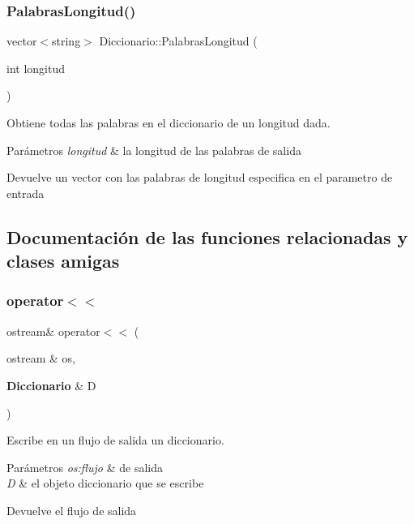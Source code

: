 \subsubsection{Palabras\+Longitud()}
{\footnotesize\ttfamily vector$<$string$>$ Diccionario\+::\+Palabras\+Longitud (\begin{DoxyParamCaption}\item[{int}]{longitud }\end{DoxyParamCaption})\hspace{0.3cm}{\ttfamily [inline]}}



Obtiene todas las palabras en el diccionario de un longitud dada. 


\begin{DoxyParams}{Parámetros}
{\em longitud} & la longitud de las palabras de salida \\
\hline
\end{DoxyParams}
\begin{DoxyReturn}{Devuelve}
un vector con las palabras de longitud especifica en el parametro de entrada 
\end{DoxyReturn}


\subsection{Documentación de las funciones relacionadas y clases amigas}
\mbox{\label{classDiccionario_ab113838fe9eefef3cc1c6710e45bde31}} 
\subsubsection{operator$<$$<$}
{\footnotesize\ttfamily ostream\& operator$<$$<$ (\begin{DoxyParamCaption}\item[{ostream \&}]{os,  }\item[{\textbf{ Diccionario} \&}]{D }\end{DoxyParamCaption})\hspace{0.3cm}{\ttfamily [friend]}}



Escribe en un flujo de salida un diccionario. 


\begin{DoxyParams}{Parámetros}
{\em os\+:flujo} & de salida \\
\hline
{\em D} & el objeto diccionario que se escribe \\
\hline
\end{DoxyParams}
\begin{DoxyReturn}{Devuelve}
el flujo de salida 
\end{DoxyReturn}
\mbox{\label{classDiccionario_a940c6d9371bca891c95a5a044a42905f}} 
